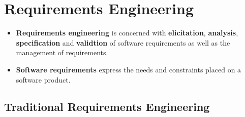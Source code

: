 \documentclass[ieeetran]{article}
\begin{document}
\section{Requirements Engineering} %
\label{sec:requirements_engineering}

\begin{itemize}
  \item \textbf{Requirements engineering} is concerned with \textbf{elicitation}, \textbf{analysis}, \textbf{specification} and \textbf{validtion} of software requirements as well as the management of requirements.

\item \textbf{Software requirements} express the needs and constraints placed on a software product.
\end{itemize}

\subsection{Traditional Requirements Engineering} %
\label{sub:traditional_requirements_engineering}




























\end{document}
